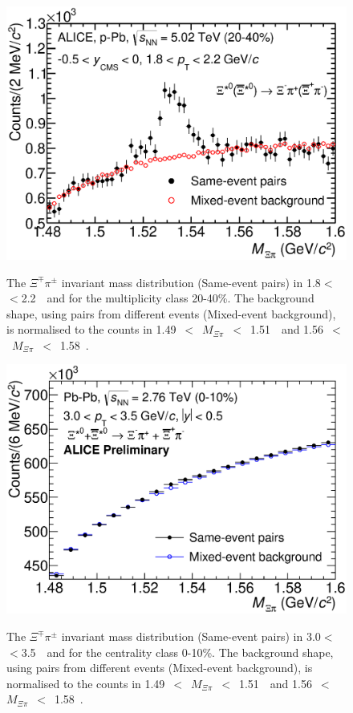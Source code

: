 \begin{figure}[htbp]
\begin{center}
\includegraphics[width=12.0cm]{./Version1/FigChapter5/Extraction/SigpPb_Before.eps}
\hspace{0.5cm}
\label{fig:sigpPbb} 
\caption{ The $\Xi^{\mp}\pi^{\pm}$ invariant mass distribution (Same-event pairs) in 
1.8$<$ \pt $<$2.2~\gmom~and for the multiplicity class 20-40\%. The background shape, 
using pairs from different events (Mixed-event background), is normalised to the counts in 
1.49~$<$~$M_{\Xi\pi}$~$<$~1.51~\Gmass~and 1.56~$<$~$M_{\Xi\pi}$~$<$~1.58~\Gmass. }
\end{center}
\end{figure}

\begin{figure}[htbp]
\begin{center}
\includegraphics[width=12.0cm]{./Version1/FigChapter5/Extraction/SigPbPb_Before.eps}
\hspace{0.5cm}
\label{fig:sigPbPbb} 
\caption{ The $\Xi^{\mp}\pi^{\pm}$ invariant mass distribution (Same-event pairs) in 
3.0$<$ \pt $<$3.5~\gmom~and for the centrality class 0-10\%. The background shape, 
using pairs from different events (Mixed-event background), is normalised to the counts in 
1.49~$<$~$M_{\Xi\pi}$~$<$~1.51~\Gmass~and 1.56~$<$~$M_{\Xi\pi}$~$<$~1.58~\Gmass. }
\end{center}
\end{figure}

